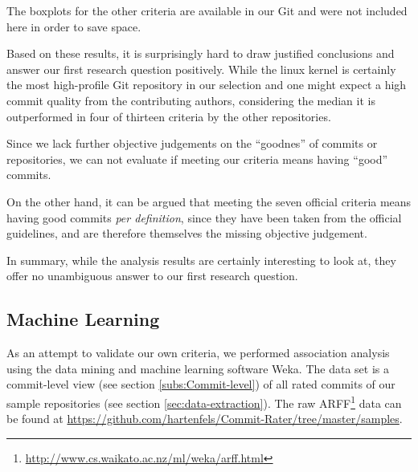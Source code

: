 The boxplots for the other criteria are available in our Git and were not included here in order to save space.

Based on these results, it is surprisingly hard to draw justified conclusions and answer our first research question positively. While the linux kernel is certainly the most high-profile Git repository in our selection and one might expect a high commit quality from the contributing authors, considering the median it is outperformed in four of thirteen criteria by the other repositories.

Since we lack further objective judgements on the ``goodnes'' of commits or repositories, we can not evaluate if meeting our criteria means having ``good'' commits.

On the other hand, it can be argued that meeting the seven official criteria means having good commits \emph{per definition}, since they have been taken from the official guidelines, and are therefore themselves the missing objective judgement.

In summary, while the analysis results are certainly interesting to look at, they offer no unambiguous answer to our first research question.

\subsection{Machine Learning}
\label{sec:results2}

As an attempt to validate our own criteria, we performed association analysis using the data mining and machine learning software Weka\cite{Weka}. The data set is a commit-level view (see section \ref{subs:Commit-level}) of all rated commits of our sample repositories (see section \ref{sec:data-extraction}). The raw ARFF\footnote{\url{http://www.cs.waikato.ac.nz/ml/weka/arff.html}} data can be found at \url{https://github.com/hartenfels/Commit-Rater/tree/master/samples}.

